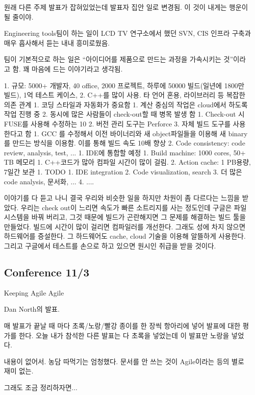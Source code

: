 \documentclass[a4paper]{article}
\begin{document}
원래 다른 주제 발표가 잡혀있었는데 발표자 집안 일로 변경됨. 이 것이
내게는 행운이 될 줄이야.
 
Engineering tools팀이 하는 일이 LCD TV 연구소에서 했던 SVN, CIS 인프라
구축과 매우 흡사해서 듣는 내내 흥미로웠음.
 
팀이 기본적으로 하는 일은 ``아이디어를 제품으로 만드는 과정을 가속시키는
것''이라고 함. 꽤 마음에 드는 이야기라고 생각됨.
 
1. 규모: 5000+ 개발자, 40 office, 2000 프로젝트, 하루에 50000 빌드(일년에 1800만 빌드), 1억  테스트 케이스,  
2. C++를 많이 사용. 타 언어 혼용, 라이브러리 등 복잡한 의존 관계
1. 코딩 스타일과 자동화가 중요함
1. 계산 중심의 작업은 cloud에서 하도록 작업 진행 중
2. 동시에 많은 사람들이 check-out할 때 병목 발생 함
1. Check-out 시 FUSE를 사용해 수정하는 10%
2. 버전 관리 도구는 Perforce
3. 자체 빌드 도구를 사용한다고 함
1. GCC 를 수정해서  이전 바이너리와 새 object파일들을 이용해 새 binary를 만드는 방식을 이용함. 이를 통해 빌드 속도 10배 향상
2. Code consistency: code review, analysis, test, ...
1. IDE에 통합할 예정
1. Build machine: 1000 cores, 50+ TB 메모리
1. C++코드가 많아 컴파일 시간이 많이 걸림.
2. Action cache: 1 PB용량, 7일간 보관
1. TODO
1. IDE integration 
2. Code  visualization, search
3. 더 많은 code analysis, 문서화, ...
4. .... 
 
이야기를 다 듣고 나니 결국 우리와 비슷한 일을 하지만 차원이 좀 다르다는
느낌을 받았다. 우리는 check out이 느리면 속도가 빠른 소트리지를 사는
정도인데 구글은 파일시스템을 바꿔 버리고, 그것 때문에 빌드가 곤란해지면
그 문제를 해결하는 빌드 툴을 만들었다. 빌드에 시간이 많이 걸리면
컴파일러를 개선한다. 그래도 성에 차지 않으면 하드웨어를 증설한다. 그
하드웨어도 cache, cloud 기술을 이용해 알뜰하게 사용한다. 그리고
구글에서 테스트를 손으로 하고 있으면 원시인 취급을 받을 것이다.

\subsection{Conference 11/3}Keeping Agile Agile
 
Dan North의 발표.  

매 발표가 끝날 때 마다 초록/노랑/빨강 종이를 한 장씩 항아리에 넣어
발표에 대한 평가를 한다.  오늘 내가 참석한 다른 발표는 다 초록을
넣었는데 이 발표만 노랑을 넣었다.
 
내용이 없어서. 농담 따먹기는 엄청했다. 문서를 안 쓰는 것이 Agile이라는 등의 별로 재미 없는.
 
그래도 조금 정리하자면...
 
\end{document}
